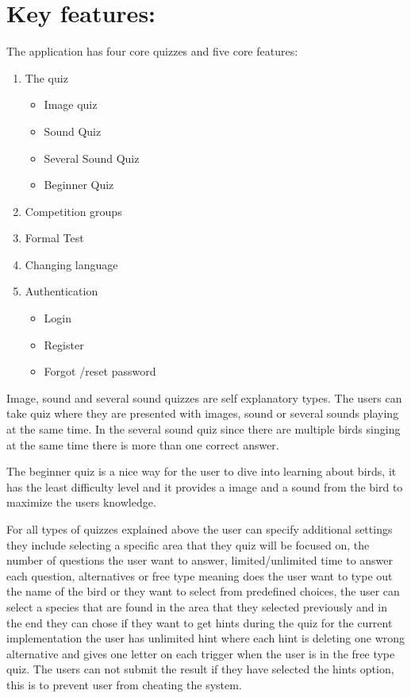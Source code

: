 \section{Key features:}
\label{sec:keyfeatures}
The application has four core quizzes and five core features:
\begin{enumerate}
    \item The quiz
    \begin{itemize}
        \item Image quiz
        \item Sound Quiz
        \item Several Sound Quiz
        \item Beginner Quiz
    \end{itemize}
    \item Competition groups
    \item Formal Test
    \item Changing language
    \item Authentication
    \begin{itemize}
        \item Login
        \item Register 
        \item Forgot /reset password
    \end{itemize}
\end{enumerate}

\break

Image, sound and several sound quizzes are self explanatory types. The users can take quiz where they are presented with images, sound or several sounds playing at the same time. In the several sound quiz since there are multiple birds singing at the same time there is more than one correct answer.

The beginner quiz is a nice way for the user to dive into learning about birds, it has the least difficulty level and it provides a image and a sound from the bird to maximize the users knowledge. 

For all types of quizzes explained above the user can specify additional settings they include selecting a specific area that they quiz will be focused on, the number of questions the user want to answer, limited/unlimited time to answer each question, alternatives or free type meaning does the user want to type out the name of the bird or they want to select from predefined choices, the user can select a species that are found in the area that they selected previously and in the end they can chose if they want to get hints during the quiz for the current implementation the user has unlimited hint where each hint is deleting one wrong alternative and gives one letter on each trigger when the user is in the free type quiz. The users can not submit the result if they have selected the hints option, this is to prevent user from cheating the system.

